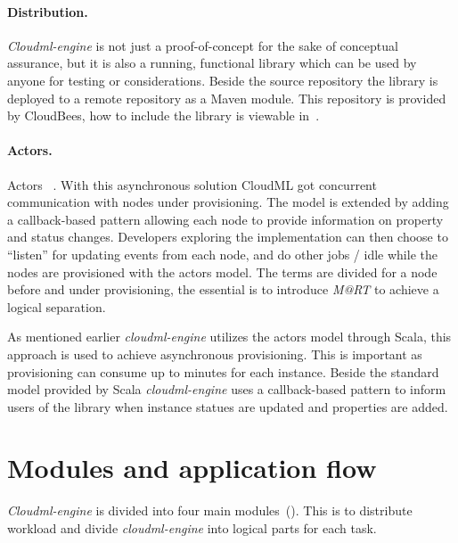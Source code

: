 \paragraph{Distribution.}

\emph{Cloudml-engine} is not just a proof-of-concept for the sake of conceptual assurance, but it is 
also a running, functional library which can be used by anyone for testing or considerations.
Beside the source repository\cite{cloudml-engine} the library is deployed to a remote repository
\cite{cloudbees-cloudml-engine} as a Maven module.
This repository is provided by CloudBees, 
how to include the library is viewable in~.

\paragraph{Actors.}

Actors ~\cite{actors:haller07}.
With this asynchronous solution CloudML got concurrent communication with nodes under provisioning.
The model is extended by adding a callback-based pattern allowing each node to provide 
information on property and status changes.
Developers exploring the implementation can then choose to ``listen'' for updating events from each node,
and do other jobs / idle while the nodes are provisioned with the actors model.
The terms are divided for a node before and under provisioning, the essential is to introduce 
\emph{M@RT} to achieve a logical separation.

\hr

As mentioned earlier \emph{cloudml-engine} utilizes the actors model through Scala,
this approach is used to achieve asynchronous provisioning.
This is important as provisioning can consume up to minutes for each instance.
Beside the standard model provided by Scala \emph{cloudml-engine} uses
a callback-based pattern to inform users of the library when instance statues
are updated and properties are added.

\section{Modules and application flow}





\emph{Cloudml-engine} is divided into four main modules~().
This is to distribute workload and divide \emph{cloudml-engine} into logical parts for each task.

